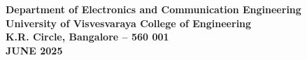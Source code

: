 \begin{titlepage}
\begin{center}
  \textbf{Department of Electronics and Communication Engineering} \\[0.2cm]
  \textbf{University of Visvesvaraya College of Engineering} \\[0.2cm]
  \textbf{K.R. Circle, Bangalore – 560 001} \\[0.2cm]
  \textbf{JUNE 2025}
    
    	
    	

    
    

  \end{center}
\end{titlepage}

